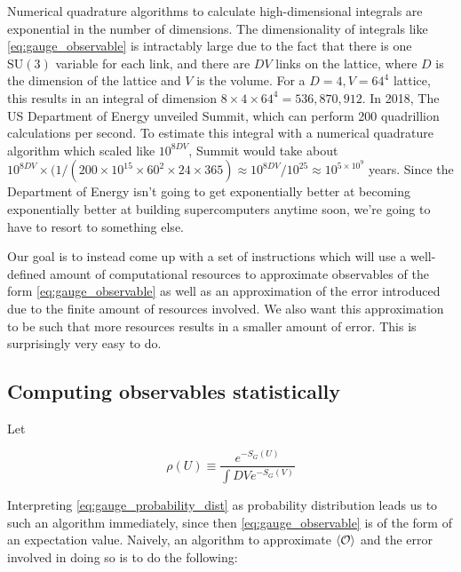 \documentclass[11pt]{article}
\begin{document}
Numerical quadrature algorithms to calculate high-dimensional integrals are exponential in the number of dimensions. The dimensionality of integrals like \eqref{eq:gauge_observable} is intractably large due to the fact that there is one $\mathrm{SU}(3)$ variable for each link, and there are $DV$ links on the lattice, where $D$ is the dimension of the lattice and $V$ is the volume. For a $D=4, V=64^4$ lattice, this results in an integral of dimension $8\times4\times 64^4=536,870,912$. In 2018, The US Department of Energy unveiled Summit, which can perform 200 quadrillion calculations per second. To estimate this integral with a numerical quadrature algorithm which scaled like $10^{8DV}$, Summit would take about $10^{8DV}\times (1/(200\times 10^{15}\times 60^2\times 24\times 365)\approx 10^{8DV}/10^{25}\approx 10^{5\times 10^9}$ years. Since the Department of Energy isn't going to get exponentially better at becoming exponentially better at building supercomputers anytime soon, we're going to have to resort to something else.

Our goal is to instead come up with a set of instructions which will use a well-defined amount of computational resources to approximate observables of the form \eqref{eq:gauge_observable} as well as an approximation of the error introduced due to the finite amount of resources involved. We also want this approximation to be such that more resources results in a smaller amount of error. This is surprisingly very easy to do. 

\subsection{Computing observables statistically}

\label{sec:naive_algorithm}

Let

\begin{equation}\label{eq:gauge_probability_dist}\rho(U)\equiv\frac{e^{-S_G(U)}}{\int DV e^{-S_G(V)}}\end{equation}

Interpreting \eqref{eq:gauge_probability_dist} as probability distribution leads us to such an algorithm immediately, since then \eqref{eq:gauge_observable} is of the form of an expectation value. Naively, an algorithm to approximate $\braket{\mathcal O}$ and the error involved in doing so is to do the following:
\end{document}
